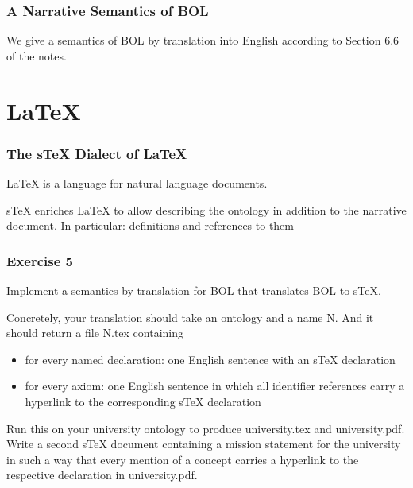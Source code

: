 \begin{frame}\frametitle{A Narrative Semantics of BOL}
We give a semantics of BOL by translation into English according to Section 6.6 of the notes.
\end{frame}

\section{LaTeX}

\begin{frame}\frametitle{The sTeX Dialect of LaTeX}
LaTeX is a language for natural language documents.

sTeX enriches LaTeX to allow describing the ontology in addition to the narrative document.
In particular: definitions and references to them
\end{frame}

\begin{frame}\frametitle{Exercise 5}
Implement a semantics by translation for BOL that translates BOL to sTeX.

Concretely, your translation should take an ontology and a name N.
And it should return a file N.tex containing
\begin{itemize}
 \item for every named declaration: one English sentence with an sTeX declaration
 \item for every axiom: one English sentence in which all identifier references carry a hyperlink to the corresponding sTeX declaration
\end{itemize}

Run this on your university ontology to produce university.tex and university.pdf.
Write a second sTeX document containing a mission statement for the university in such a way that every mention of a concept carries a hyperlink to the respective declaration in university.pdf.
\end{frame}
